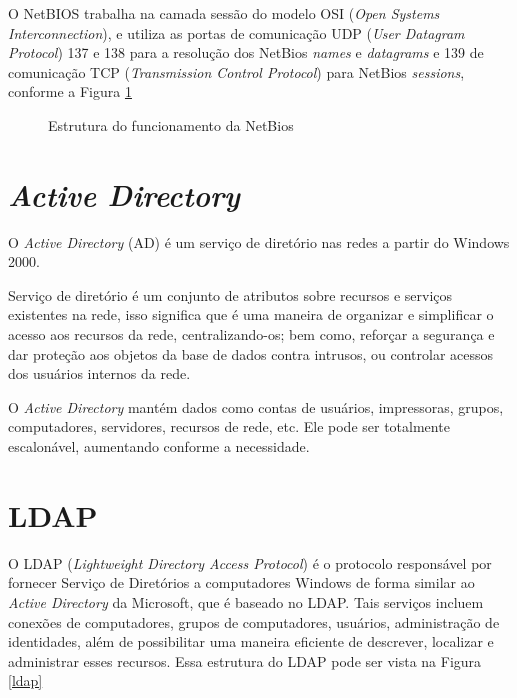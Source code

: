 O NetBIOS trabalha na camada sessão do modelo OSI (\textit{Open Systems Interconnection}), e utiliza as portas de comunicação UDP (\textit{User Datagram Protocol}) 137 e 138 para a resolução dos NetBios \textit{names} e \textit{datagrams} e 139 de comunicação TCP (\textit{Transmission Control Protocol}) para NetBios \textit{sessions}, conforme a Figura \ref{netbios}

\begin{figure}[ht]
   	\centering
   	\caption{Estrutura do funcionamento da NetBios \cite{NETBIOS}}
    \label{netbios}
\end{figure}

\section{\textit{Active Directory}}

O \textit{Active Directory} (AD) é um serviço de diretório nas redes a partir do Windows 2000.

Serviço de diretório é um conjunto de atributos sobre recursos e serviços existentes na rede, isso significa que é uma maneira de organizar e simplificar o acesso aos recursos da rede, centralizando-os; bem como, reforçar a segurança e dar proteção aos objetos da base de dados contra intrusos, ou controlar acessos dos usuários internos da rede.

O \textit{Active Directory} mantém dados como contas de usuários, impressoras, grupos, computadores, servidores, recursos de rede, etc. Ele pode ser totalmente escalonável, aumentando conforme a necessidade.\cite{LOSANO}

\section{LDAP}

O LDAP (\textit{Lightweight Directory Access Protocol}) é o protocolo responsável por fornecer Serviço de Diretórios a computadores Windows de forma similar ao \textit{Active Directory} da Microsoft, que é baseado no LDAP. Tais serviços incluem conexões de computadores, grupos de computadores, usuários, administração de identidades, além de possibilitar uma maneira eficiente de descrever, localizar e administrar esses recursos. Essa estrutura do LDAP pode ser vista na Figura \ref{ldap}

